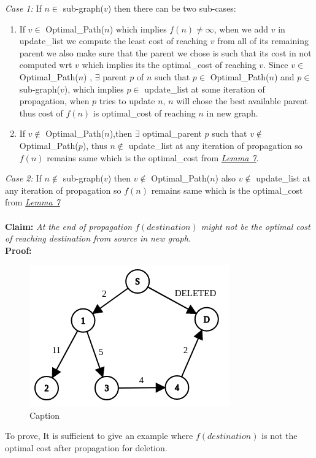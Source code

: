 \documentclass[a4paper]{article}
\begin{document}
\textit{Case 1:} If $n \in$ sub-graph($v$) then there can be two sub-cases: \begin{enumerate}
\item If $v \in$ Optimal\_Path($n$) which implies $f(n) \neq \infty$, when we add $v$ in update\_list we compute the least cost of reaching $v$ from all of its remaining parent we also make sure that the parent we chose is such that its cost in not computed wrt $v$ which implies its the optimal\_cost of reaching $v$. Since $v \in$ Optimal\_Path($n$) , $\exists$ parent $p$ of $n$ such that $p \in$ Optimal\_Path($n$) and $p \in$ sub-graph($v$), which implies $p \in$ update\_list at some iteration of propagation, when $p$ tries to update $n$, $n$ will chose the best available parent thus cost of $f(n)$ is optimal\_cost of reaching $n$ in new graph.
\item If $v \notin$ Optimal\_Path($n$),then $\exists$ optimal\_parent $p$ such that $v \notin $ Optimal\_Path($p$), thus $n \notin$ update\_list at any iteration of propagation so $f(n)$ remains same which is the optimal\_cost from \hyperlink{Lemma 7}{\textit{Lemma 7}}. 
\end{enumerate}
\textit{Case 2:} If $n \notin$ sub-graph($v$) then $v \notin$ Optimal\_Path($n$) also $v \notin$ update\_list at any iteration of propagation so $f(n)$ remains same which is the optimal\_cost from \hyperlink{Lemma 7}{\textit{Lemma 7}}\\
\\
\textbf{Claim:} \textit{At the end of propagation $f(destination)$ might not be the optimal cost of reaching destination from source in new graph. }\\
\textbf{Proof:}
\begin{figure}[H]
    \centering
    \includegraphics[scale=0.4]{img/del_prop.png}
    \caption{Caption}
    \label{fig:deletion_proof}
\end{figure}
To prove, It is sufficient to give an example where $f(destination)$ is not the optimal cost after propagation for deletion.\\
\end{document}
